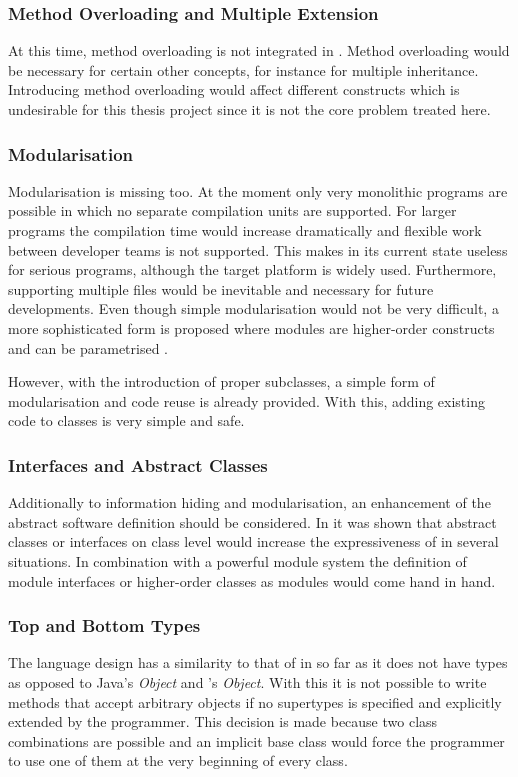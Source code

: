 \subsubsection{Method Overloading and Multiple Extension}
At this time, method overloading is not integrated in \ooplss. Method
overloading would be necessary for certain other concepts, for instance
for multiple inheritance. Introducing method overloading would affect
different constructs which is undesirable for this thesis project since
it is not the core problem treated here.

\subsubsection{Modularisation}
Modularisation is missing too. At the moment only very monolithic programs
are possible in which no separate compilation units are supported. For larger
programs the compilation time would increase dramatically and flexible work between
developer teams is not supported. This makes \ooplss in its current state
useless for serious programs, although the target platform is widely
used. Furthermore, supporting multiple files would be inevitable and
necessary for future developments. Even though simple modularisation would not be
very difficult, a more sophisticated form is proposed where modules are
higher-order constructs and can be parametrised \cite{dreyer_type_2003}.

However, with the introduction of proper subclasses, a simple form of
modularisation and code reuse is already provided. With this, adding
existing code to classes is very simple and safe.

\subsubsection{Interfaces and Abstract Classes}
Additionally to information hiding and modularisation, an
enhancement of the abstract software definition should be considered. In
 it was shown that abstract classes or
interfaces on class level would increase the expressiveness of \ooplss
in several situations. In combination with a powerful module system
the definition of module interfaces or higher-order classes as modules
would come hand in hand.

\subsubsection{Top and Bottom Types}
The language design has a similarity to that of \cpp in so far as it
does not have types as opposed to Java's \emph{Object} and \cs's \emph
{Object}. With this it is not possible to write methods that accept
arbitrary objects if no supertypes is specified and explicitly extended
by the programmer. This decision is made because two class combinations
are possible and an implicit base class would force the programmer to
use one of them at the very beginning of every class.

